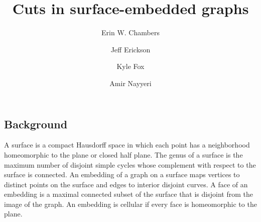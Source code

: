 \documentclass[natbib]{svcyclop}
\begin{document}
\title{Cuts in surface-embedded graphs}


\author{
	Erin W. Chambers
\and
	Jeff Erickson
\and
	Kyle Fox
\and
	Amir Nayyeri}







\maketitle


\ProbDef

\subsection{Background}


A surface is a compact Hausdorff space in which each point has a neighborhood homeomorphic to the plane or closed half plane.
The genus of a surface is the maximum number of disjoint simple cycles whose complement with respect to the surface is connected.
An embedding of a graph on a surface maps vertices to distinct points on the surface and edges to interior disjoint curves.  
A face of an embedding is a maximal connected subset of the surface that is disjoint from the image of the graph.
An embedding is cellular if every face is homeomorphic to the plane.
\end{document}
